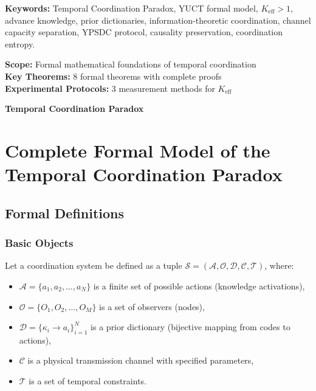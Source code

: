 \documentclass[12pt]{article}
\begin{document}
\begin{titlepage}
\begin{center}
			\vspace{0.5cm}
			\normalsize
			\textbf{Keywords:} Temporal Coordination Paradox, YUCT formal model, $K_{\text{eff}} > 1$, advance knowledge, prior dictionaries, information-theoretic coordination, channel capacity separation, YPSDC protocol, causality preservation, coordination entropy.
			
			\vspace{0cm}
			\normalsize
			
			\textbf{Scope:} Formal mathematical foundations of temporal coordination \\
			\textbf{Key Theorems:} 8 formal theorems with complete proofs \\
			\textbf{Experimental Protocols:} 3 measurement methods for $K_{\text{eff}}$ \\
			
			\vspace{0.5cm}
			\normalsize
			
		\end{center}
	\end{titlepage}	
	\begin{center}
		\vspace*{0.5cm}
		\Huge\textbf{Temporal Coordination Paradox}
		\vspace{1cm}
	\end{center}
	
	\section{Complete Formal Model of the Temporal Coordination Paradox}
	\label{app:formal-model}
	
	\subsection{Formal Definitions}
	\label{app:definitions}
	
	\subsubsection{Basic Objects}
	
	Let a coordination system be defined as a tuple $\mathcal{S} = (\mathcal{A}, \mathcal{O}, \mathcal{D}, \mathcal{C}, \mathcal{T})$, where:
	
	\begin{itemize}
		\item $\mathcal{A} = \{a_1, a_2, \dots, a_N\}$ is a finite set of possible actions (knowledge activations),
		\item $\mathcal{O} = \{O_1, O_2, \dots, O_M\}$ is a set of observers (nodes),
		\item $\mathcal{D} = \{\kappa_i \to a_i\}_{i=1}^N$ is a prior dictionary (bijective mapping from codes to actions),
		\item $\mathcal{C}$ is a physical transmission channel with specified parameters,
		\item $\mathcal{T}$ is a set of temporal constraints.
	\end{itemize}
	
\end{document}
